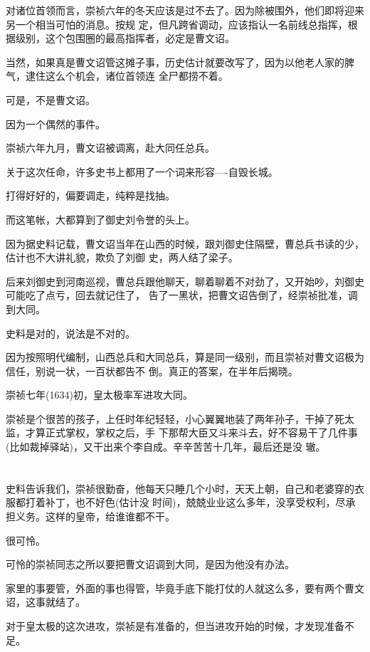 \documentclass[11pt,a4paper,onecolumn]{article}
\begin{document}
对诸位首领而言，崇祯六年的冬天应该是过不去了。因为除被围外，他们即将迎来另一个相当可怕的消息。按规
定，但凡跨省调动，应该指认一名前线总指挥，根据级别，这个包围圈的最高指挥者，必定是曹文诏。

当然，如果真是曹文诏管这摊子事，历史估计就要改写了，因为以他老人家的脾气，逮住这么个机会，诸位首领连
全尸都捞不着。

可是，不是曹文诏。

因为一个偶然的事件。

崇祯六年九月，曹文诏被调离，赴大同任总兵。

关于这次任命，许多史书上都用了一个词来形容----自毁长城。

打得好好的，偏要调走，纯粹是找抽。

而这笔帐，大都算到了御史刘令誉的头上。

因为据史料记载，曹文诏当年在山西的时候，跟刘御史住隔壁，曹总兵书读的少，估计也不大讲礼貌，欺负了刘御
史，两人结了梁子。

后来刘御史到河南巡视，曹总兵跟他聊天，聊着聊着不对劲了，又开始吵，刘御史可能吃了点亏，回去就记住了，
告了一黑状，把曹文诏告倒了，经崇祯批准，调到大同。

史料是对的，说法是不对的。

因为按照明代编制，山西总兵和大同总兵，算是同一级别，而且崇祯对曹文诏极为信任，别说一状，一百状都告不
倒。真正的答案，在半年后揭晓。

崇祯七年(1634)初，皇太极率军进攻大同。

崇祯是个很苦的孩子，上任时年纪轻轻，小心翼翼地装了两年孙子，干掉了死太监，才算正式掌权，掌权之后，手
下那帮大臣又斗来斗去，好不容易干了几件事(比如裁掉驿站)，又干出来个李自成。辛辛苦苦十几年，最后还是没
辙。

\section[\thesection]{}

史料告诉我们，崇祯很勤奋，他每天只睡几个小时，天天上朝，自己和老婆穿的衣服都打着补丁，也不好色(估计没
时间)，兢兢业业这么多年，没享受权利，尽承担义务。这样的皇帝，给谁谁都不干。

很可怜。

可怜的崇祯同志之所以要把曹文诏调到大同，是因为他没有办法。

家里的事要管，外面的事也得管，毕竟手底下能打仗的人就这么多，要有两个曹文诏，这事就结了。

对于皇太极的这次进攻，崇祯是有准备的，但当进攻开始的时候，才发现准备不足。
\end{document}
